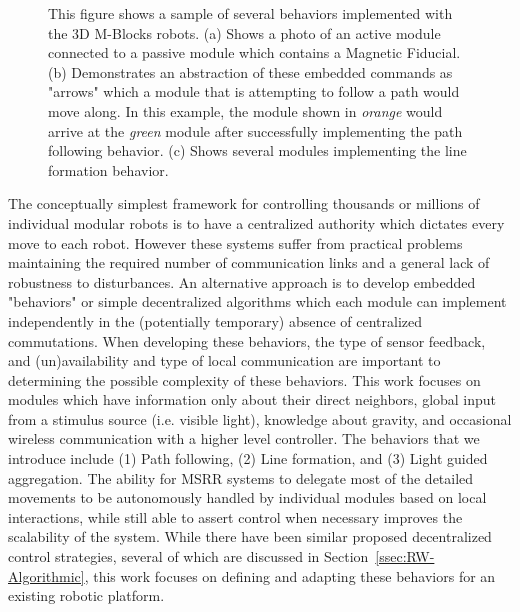 \begin{figure}[t]
\begin{subfigure}[b]{\linewidth}
	\end{subfigure}
	
	
	\caption{This figure shows a sample of several behaviors implemented with the 3D M-Blocks robots. (a) Shows a photo of an active module connected to a passive module which contains a Magnetic Fiducial. (b) Demonstrates an abstraction of these embedded commands as "arrows" which a module that is attempting to follow a path would move along. In this example, the module shown in \emph{orange} would arrive at the \emph{green} module after successfully implementing the path following behavior. (c) Shows several modules implementing the line formation behavior.}
	
	\label{fig:intro}
\end{figure}

The conceptually simplest framework for controlling thousands or millions of individual modular robots is to have a centralized authority which dictates every move to each robot. However these systems suffer from practical problems maintaining the required number of communication links and a general lack of robustness to disturbances. An alternative approach is to develop embedded "behaviors" or simple decentralized algorithms which each module can implement independently in the (potentially temporary) absence of centralized commutations. When developing these behaviors, the type of sensor feedback, and (un)availability and type of local communication are important to determining the possible complexity of these behaviors. This work focuses on modules which have information only about their direct neighbors, global input from a stimulus source (i.e. visible light), knowledge about gravity, and occasional wireless communication with a higher level controller. The behaviors that we introduce include (1) Path following, (2) Line formation, and (3) Light guided aggregation. The ability for MSRR systems to delegate most of the detailed movements to be autonomously handled by individual modules based on local interactions, while still able to assert control when necessary improves the scalability of the system. While there have been similar proposed decentralized control strategies, several of which are discussed in Section~\ref{ssec:RW-Algorithmic}, this work focuses on defining and adapting these behaviors for an existing robotic platform.

